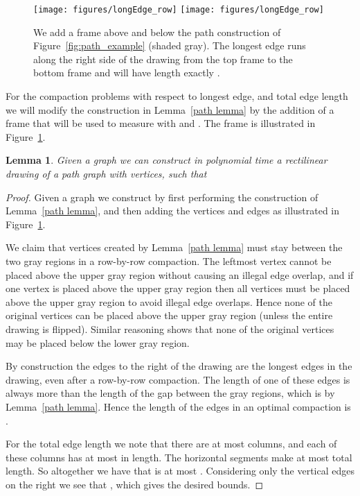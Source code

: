 \documentclass[12pt]{article}
\newtheorem{lemma}[theorem]{Lemma}
\theoremstyle{definitions}
\begin{document}
\begin{figure}[ht]
\centering
\ifFull
\texttt{[image: figures/longEdge\_row]}
\else
\texttt{[image: figures/longEdge\_row]}
\fi
\caption{
\label{fig:path_example_edgeLength}
We add a frame above and below the path construction of Figure~\ref{fig:path_example}
(shaded gray). The longest edge runs along the right side of the drawing from the top
frame to the bottom frame and will have length exactly .}
\end{figure}

For the compaction problems with respect to longest edge, and total edge length we will modify the construction in Lemma~\ref{path lemma} by the addition of a frame that will be used to measure  with  and . The frame is illustrated in Figure~\ref{fig:path_example_edgeLength}.

\begin{lemma}
\label{lem:rxrframe}
Given a graph  we can construct in polynomial time a rectilinear drawing  of a path graph with  vertices, such that

\end{lemma}
\begin{proof}
Given a graph  we construct  by first performing the construction of Lemma~\ref{path lemma}, and then adding the vertices and edges as illustrated in Figure~\ref{fig:path_example_edgeLength}.

We claim that vertices created by Lemma~\ref{path lemma} must stay between the two gray regions in a row-by-row compaction. The leftmost vertex cannot be placed above the upper gray region without causing an illegal edge overlap, and if one vertex is placed above the upper gray region then all vertices must be placed above the upper gray region to avoid illegal edge overlaps. Hence none of the original vertices can be placed above the upper gray region (unless the entire drawing is flipped). Similar reasoning shows that none of the original vertices may be placed below the lower gray region.

By construction the  edges to the right of the drawing are the longest edges in the drawing, even after a row-by-row compaction. The length of one of these edges is always  more than the length of the gap between the gray regions, which is  by Lemma~\ref{path lemma}. Hence the length of the edges in an optimal compaction is .

For the total edge length we note that there are at most  columns, and each of these columns has at most  in length. The horizontal segments make at most  total length. So altogether we have that  is at most . Considering only the vertical edges on the right we see that , which gives the desired bounds.
\end{proof}
\end{document}
